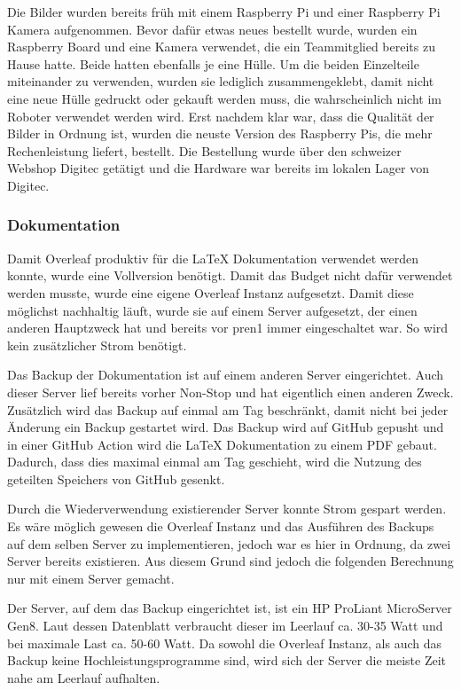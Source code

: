 Die Bilder wurden bereits früh mit einem Raspberry Pi und einer Raspberry Pi Kamera aufgenommen. Bevor dafür etwas neues bestellt wurde, wurden ein Raspberry Board und eine Kamera verwendet, die ein Teammitglied bereits zu Hause hatte. Beide hatten ebenfalls je eine Hülle.
Um die beiden Einzelteile miteinander zu verwenden, wurden sie lediglich zusammengeklebt, damit nicht eine neue Hülle gedruckt oder gekauft werden muss, die wahrscheinlich nicht im Roboter verwendet werden wird.
Erst nachdem klar war, dass die Qualität der Bilder in Ordnung ist, wurden die neuste Version des Raspberry Pis, die mehr Rechenleistung liefert, bestellt. Die Bestellung wurde über den schweizer Webshop Digitec getätigt und die Hardware war bereits im lokalen Lager von Digitec. 

\subsubsection{Dokumentation}

Damit Overleaf produktiv für die LaTeX Dokumentation verwendet werden konnte, wurde eine Vollversion benötigt. Damit das Budget nicht dafür verwendet werden musste, wurde eine eigene Overleaf Instanz aufgesetzt. Damit diese möglichst nachhaltig läuft, wurde sie auf einem Server aufgesetzt, der einen anderen Hauptzweck hat und bereits vor \acrshort{pren1} immer eingeschaltet war. So wird kein zusätzlicher Strom benötigt.

Das Backup der Dokumentation ist auf einem anderen Server eingerichtet. Auch dieser Server lief bereits vorher Non-Stop und hat eigentlich einen anderen Zweck. Zusätzlich wird das Backup auf einmal am Tag beschränkt, damit nicht bei jeder Änderung ein Backup gestartet wird. Das Backup wird auf GitHub gepusht und in einer GitHub Action wird die LaTeX Dokumentation zu einem PDF gebaut. Dadurch, dass dies maximal einmal am Tag geschieht, wird die Nutzung des geteilten Speichers von GitHub gesenkt.

Durch die Wiederverwendung existierender Server konnte Strom gespart werden. Es wäre möglich gewesen die Overleaf Instanz und das Ausführen des Backups auf dem selben Server zu implementieren, jedoch war es hier in Ordnung, da zwei Server bereits existieren. Aus diesem Grund sind jedoch die folgenden Berechnung nur mit einem Server gemacht.

Der Server, auf dem das Backup eingerichtet ist, ist ein HP ProLiant MicroServer Gen8. Laut dessen Datenblatt verbraucht dieser im Leerlauf ca. 30-35 Watt und bei maximale Last ca. 50-60 Watt.\cite{proliant} Da sowohl die Overleaf Instanz, als auch das Backup keine Hochleistungsprogramme sind, wird sich der Server die meiste Zeit nahe am Leerlauf aufhalten.

